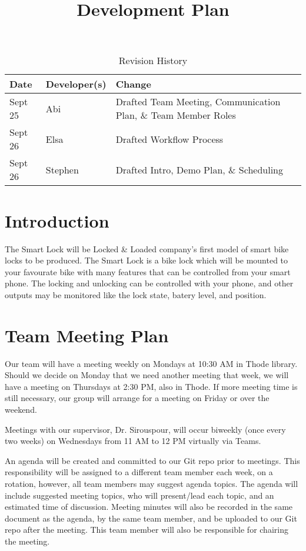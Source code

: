 \documentclass{article}
\title{Development Plan\\\progname}
\author{\authname}
\date{}
\begin{document}
\maketitle

\begin{table}[hp]
\caption{Revision History} \label{TblRevisionHistory}
\begin{tabularx}{\textwidth}{llX}
\toprule
\textbf{Date} & \textbf{Developer(s)} & \textbf{Change}\\
\midrule
Sept 25 & Abi & Drafted Team Meeting, Communication Plan, \& Team Member Roles\\
Sept 26 & Elsa & Drafted Workflow Process\\
Sept 26 & Stephen & Drafted Intro, Demo Plan, \& Scheduling\\
\bottomrule

\end{tabularx}
\end{table}

\newpage



\section{Introduction}

The Smart Lock will be Locked \& Loaded company's first model of smart bike locks to be produced. The Smart Lock is a bike lock which will be mounted to your favourate bike with many features that can be controlled from your smart phone. The locking and unlocking can be controlled with your phone, and other outputs may be monitored like the lock state, batery level, and position.

\section{Team Meeting Plan}

Our team will have a meeting weekly on Mondays at 10:30 AM in Thode library.  Should we decide on Monday that we need another meeting that week, we will have a meeting on Thursdays at 2:30 PM, also in Thode.  If more meeting time is still necessary, our group will arrange for a meeting on Friday or over the weekend.

Meetings with our supervisor, Dr. Sirouspour, will occur biweekly (once every two weeks) on Wednesdays from 11 AM to 12 PM virtually via Teams.

An agenda will be created and committed to our Git repo prior to meetings.  This responsibility will be assigned to a different team member each week, on a rotation, however, all team members may suggest agenda topics.  The agenda will include suggested meeting topics, who will present/lead each topic, and an estimated time of discussion. Meeting minutes will also be recorded in the same document as the agenda, by the same team member, and be uploaded to our Git repo after the meeting.  This team member will also be responsible for chairing the meeting. 
\end{document}
